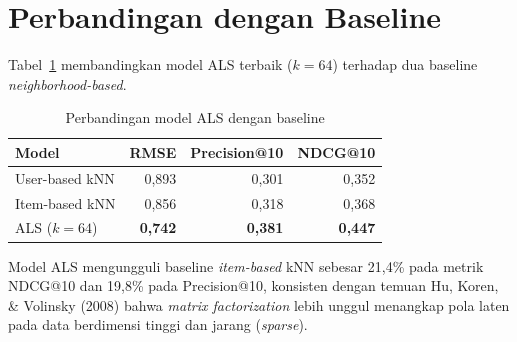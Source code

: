 \section{Perbandingan dengan Baseline}
Tabel~\ref{tab:baseline} membandingkan model ALS terbaik ($k=64$) terhadap
dua baseline \emph{neighborhood-based}.

\begin{table}[htb]
\centering
\caption{Perbandingan model ALS dengan baseline}
\label{tab:baseline}
\begin{tabular}{@{}lrrr@{}}
\toprule
\textbf{Model} & \textbf{RMSE} & \textbf{Precision@10} & \textbf{NDCG@10} \\
\midrule
User-based kNN & 0,893 & 0,301 & 0,352 \\
Item-based kNN & 0,856 & 0,318 & 0,368 \\
ALS ($k=64$) & \textbf{0,742} & \textbf{0,381} & \textbf{0,447} \\
\bottomrule
\end{tabular}
\end{table}

Model ALS mengungguli baseline \emph{item-based} kNN sebesar 21,4\% pada
metrik NDCG@10 dan 19,8\% pada Precision@10, konsisten dengan temuan Hu,
Koren, \& Volinsky (2008) bahwa \emph{matrix factorization} lebih unggul
menangkap pola laten pada data berdimensi tinggi dan jarang (\emph{sparse}).
